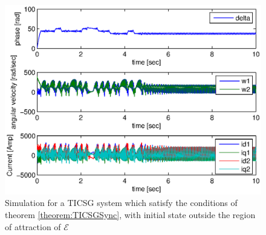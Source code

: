 \documentclass[letterpaper, 10 pt, conference]{ieeeconf}
\begin{document}
\begin{figure}[ht]
\includegraphics[scale=0.65]{OutROATICSGSimulation}

\caption{Simulation for a TICSG system which satisfy the conditions of theorem \ref{theorem:TICSGSync}, with initial state outside the region of attraction of $\mathscr{E}$}
\label{fig:OutROATICSGSimulation}
\end{figure}

%

%
%
\end{document}
